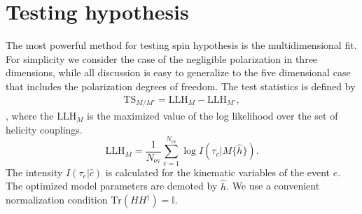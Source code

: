 \documentclass[prd,preprintnumbers,floatfix,
nofootinbib,superscriptaddress]{revtex4}
\newcommand{\diff}{\mathrm{d}}
\newcommand{\TS}{\mathrm{TS}}
\newcommand{\LLH}{\mathrm{LLH}}
\newcommand{\I}{\ensuremath{I}}
\newcommand{\II}{\ensuremath{{I\!I}}}
\newcommand{\III}{\ensuremath{{I\!I\!I}}}
\newcommand{\IV}{\ensuremath{{I\!V}}}
\begin{document}

%


\section{Testing hypothesis} \label{sec:test.statistics}
The most powerful method for testing spin hypothesis is the multidimensional fit.
For simplicity we consider the case of the negligible polarization in three dimensions, while all discussion is easy to generalize to the five dimensional case that includes
the polarization degrees of freedom.
The test statistics is defined by
\begin{align}
  \TS_{M/M'} = \LLH_M - \LLH_{M'},
\end{align},
where the $\LLH_M$ is the maximized value of the log likelihood over the set of helicity couplings.
\begin{equation}
  \LLH_M = \frac{1}{N_\mathrm{ev}} \sum_{e=1}^{N_\mathrm{ev}} \log I(\tau_e|M\{\hat{h}\}).
\end{equation}
The intensity $I(\tau_e|\hat{c})$ is calculated for the kinematic variables of the event $e$.
The optimized model parameters are demoted by $\hat{h}$. We use a convenient normalization condition $\mathrm{Tr}(HH^\dagger) = \mathbb{I}$.
\end{document}
